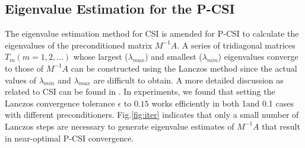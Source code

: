 \subsection{Eigenvalue Estimation for the P-CSI}
The eigenvalue estimation method for CSI \cite{hu2013scalable} is amended for P-CSI to calculate the eigenvalues of the preconditioned matrix $M^{-1}A$.
A series of tridiagonal matrices $T_m (m=1,2,...)$ whose largest ($\lambda_{max}$) and smallest ($\lambda_{min}$) eigenvalues converge to those of $M^{-1}A$
can be constructed using the Lanczos method \cite{Paige1980235} since the actual values of $\lambda_{min}$ and $\lambda_{max}$ are difficult to obtain. 
A more detailed discussion as related to CSI can be found in
\cite{hu2013scalable}.
In experiments, we found that  setting the Lanczos convergence tolerance $\epsilon$ to $0.15$ works efficiently in both 1\degree and 0.1 \degree cases with different preconditioners.
Fig.\ref{fig:iter} indicates that only a small number of Lanczos steps
are necessary to generate
eigenvalue estimates of $M^{-1}A$ that result in near-optimal P-CSI
convergence. 




